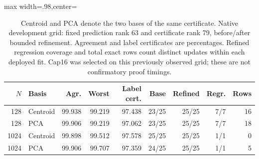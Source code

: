 \begin{table}[tbp]
\centering
\caption{Centroid and PCA denote the two bases of the same certificate. Native development grid: fixed prediction rank 63 and certificate rank 79, before/after bounded refinement. Agreement and label certificates are percentages. Refined regression coverage and total exact rows count distinct updates within each deployed fit. Cap16 was selected on this previously observed grid; these are not confirmatory proof timings.}
\label{tab:native-quality}
\begin{adjustbox}{max width=.98\textwidth,center=\textwidth}
\begin{tabular}{rlrrrrrrr}
\toprule
$N$ & Basis & Agr. & Worst & Label cert. & Base & Refined & Regr. & Rows\\
\midrule
128 & Centroid & 99.938 & 99.219 & 97.438 & 23/25 & 25/25 & 7/7 & 16\\
128 & PCA & 99.906 & 99.219 & 97.062 & 23/25 & 25/25 & 7/7 & 18\\
1024 & Centroid & 99.898 & 99.512 & 97.578 & 25/25 & 25/25 & 1/1 & 0\\
1024 & PCA & 99.906 & 99.707 & 97.359 & 24/25 & 25/25 & 1/1 & 5\\
\bottomrule
\end{tabular}
\end{adjustbox}
\end{table}
